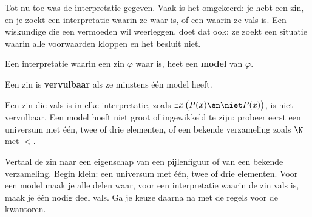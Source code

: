 Tot nu toe was de interpretatie gegeven. Vaak is het omgekeerd: je hebt een zin, en je zoekt een interpretatie waarin ze waar is, of een waarin ze vals is. Een wiskundige die een vermoeden wil weerleggen, doet dat ook: ze zoekt een situatie waarin alle voorwaarden kloppen en het besluit niet.

\begin{theorie}
Een interpretatie waarin een zin $\varphi$ waar is, heet een \textbf{\textcolor{accent}{model}} van $\varphi$.

\vspace{1mm}
Een zin is \textbf{\textcolor{accent}{vervulbaar}} als ze minstens één model heeft.
\end{theorie}

Een zin die vals is in elke interpretatie, zoals $\exists x\, \bigl(P(x) \en \niet P(x)\bigr)$, is niet vervulbaar. Een model hoeft niet groot of ingewikkeld te zijn: probeer eerst een universum met één, twee of drie elementen, of een bekende verzameling zoals $\N$ met $<$.


\begin{werkwijze}
Vertaal de zin naar een eigenschap van een pijlenfiguur of van een bekende verzameling. Begin klein: een universum met één, twee of drie elementen. Voor een model maak je alle delen waar, voor een interpretatie waarin de zin vals is, maak je één nodig deel vals. Ga je keuze daarna na met de regels voor de kwantoren.
\end{werkwijze}


